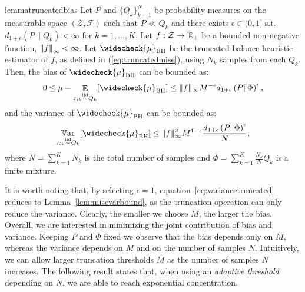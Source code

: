\documentclass{article}
\begin{document}
\begin{restatable}{lemma}{truncatedbias}\label{lem:truncatedbias}
	Let $P$ and $\{ Q_k \}_{k=1}^N$ be probability measures on the measurable space $(\mathcal{Z},\mathcal{F})$ such that $P\ll Q_k$ and there exists $\epsilon \in (0,1]$ s.t. $d_{1+\epsilon}(P\|Q_k)<\infty$ for $k=1,\dots,K$. Let $f:\mathcal{Z}\to\Reals_{+}$ be a bounded non-negative function, \ie $\norm[\infty]{f}<\infty$. Let $\widecheck{\mu}_{\text{BH}}$ be the truncated balance heuristic estimator of $f$, as defined in (\ref{eq:truncatedmise}), using $N_k$ \iid samples from each $Q_k$. Then, the bias of $\widecheck{\mu}_{\text{BH}}$ can be bounded as:
	 \begin{equation}
	 \label{eq:biastruncated}
         0 \le \mu - \Exp_{z_{ik} \simiid Q_k} [\widecheck{\mu}_{\text{BH}}] \le  \|f\|_{\infty} M^{-\epsilon} d_{1+\epsilon}\left( P \| \Phi \right)^{\epsilon},
    \end{equation}
    and the variance of $\widecheck{\mu}_{\text{BH}}$ can be bounded as:
    \begin{equation}
    \label{eq:variancetruncated}
         \Var_{z_{ik} \simiid Q_k} [\widecheck{\mu}_{\text{BH}}] \le  \|f\|_{\infty}^2 M^{1-\epsilon} \frac{d_{1+\epsilon}\left( P \| \Phi \right)^{\epsilon}}{N},
    \end{equation}
	where ${N=\sum_{k=1}^{K}N_k}$ is the total number of samples and ${\Phi=\sum_{k=1}^K\frac{N_k}{N}Q_k}$ is a finite mixture.
\end{restatable}
%
It is worth noting that, by selecting $\epsilon=1$, equation~\eqref{eq:variancetruncated} reduces to Lemma~\ref{lem:misevarbound}, as the truncation operation can only reduce the variance. Clearly, the smaller we choose $M$, the larger the bias. Overall, we are interested in minimizing the joint contribution of bias and variance. Keeping $P$ and $\Phi$ fixed we observe that the bias depends only on $M$, whereas the variance depends on $M$ and on the number of samples $N$. Intuitively, we can allow larger truncation thresholds $M$ as the number of samples $N$ increases. The following result states that, when using an \textit{adaptive threshold} depending on $N$, we are able to reach exponential concentration.
\end{document}
